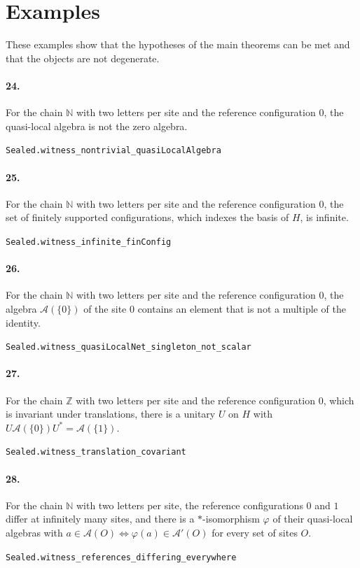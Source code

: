 \documentclass[11pt]{article}
\begin{document}
\section*{Examples}
These examples show that the hypotheses of the main theorems can be met and that the objects are not degenerate.

\paragraph{24.} For the chain $\mathbb N$ with two letters per site and the reference configuration $0$, the quasi-local algebra is not the zero algebra.\par{\footnotesize\texttt{Sealed.witness\_nontrivial\_quasiLocalAlgebra}}

\paragraph{25.} For the chain $\mathbb N$ with two letters per site and the reference configuration $0$, the set of finitely supported configurations, which indexes the basis of $H$, is infinite.\par{\footnotesize\texttt{Sealed.witness\_infinite\_finConfig}}

\paragraph{26.} For the chain $\mathbb N$ with two letters per site and the reference configuration $0$, the algebra $\mathcal A(\{0\})$ of the site $0$ contains an element that is not a multiple of the identity.\par{\footnotesize\texttt{Sealed.witness\_quasiLocalNet\_singleton\_not\_scalar}}

\paragraph{27.} For the chain $\mathbb Z$ with two letters per site and the reference configuration $0$, which is invariant under translations, there is a unitary $U$ on $H$ with $U \mathcal A(\{0\}) U^* = \mathcal A(\{1\})$.\par{\footnotesize\texttt{Sealed.witness\_translation\_covariant}}

\paragraph{28.} For the chain $\mathbb N$ with two letters per site, the reference configurations $0$ and $1$ differ at infinitely many sites, and there is a $*$-isomorphism $\varphi$ of their quasi-local algebras with $a \in \mathcal A(O) \iff \varphi(a) \in \mathcal A'(O)$ for every set of sites $O$.\par{\footnotesize\texttt{Sealed.witness\_references\_differing\_everywhere}}
\end{document}
